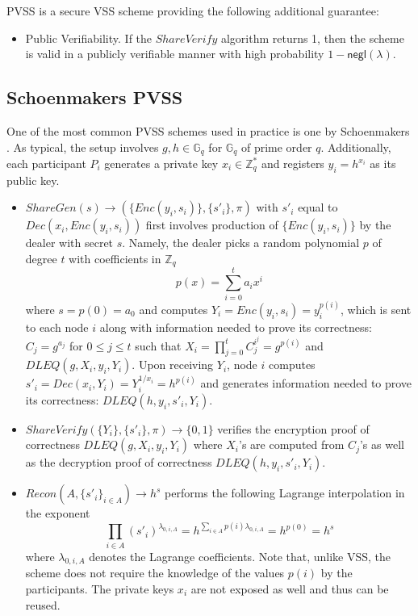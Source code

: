 \documentclass[letterpaper,twocolumn,10pt]{article}
\theoremstyle{definition}
\theoremstyle{remark}
\begin{document}
PVSS is a secure VSS scheme providing the following additional guarantee:
\begin{itemize}
    \item Public Verifiability. If the $ShareVerify$ algorithm returns 1, then the scheme is valid in a publicly verifiable manner with high probability $1 - \mathsf{negl}(\lambda)$.
\end{itemize}

\subsection{Schoenmakers PVSS}
\label{appendix:schoenmakersPVSS}
One of the most common PVSS schemes used in practice is one by Schoenmakers \cite{schoenmakers1999simple}. As typical, the setup involves $g, h \in \mathbb{G}_q$ for $\mathbb{G}_q$ of prime order $q$. Additionally, each participant $P_i$ generates a private key $x_i \in \mathbb{Z}^*_q$ and registers $y_i = h^{x_i}$ as its public key.

\begin{itemize}
\item $ShareGen(s) \rightarrow (\{Enc(y_i, s_i)\}, \{s'_i\}, \pi)$ with $s'_i$ equal to $Dec(x_i, Enc(y_i, s_i))$ first involves production of $\{Enc(y_i, s_i)\}$ by the dealer with secret $s$. Namely, the dealer picks a random polynomial $p$ of degree $t$ with coefficients in $\mathbb{Z}_q$
\[
p(x) = \sum_{i = 0}^{t} a_i x^i
\]
where $s = p(0) = a_0$ and computes $Y_i = Enc(y_i, s_i) = y_i^{p(i)}$, which is sent to each node $i$ along with information needed to prove its correctness: $C_j = g^{a_j}$ for $0 \leq j \leq t$ such that $X_i = \prod_{j = 0}^{t} C_j^{i^j} = g^{p(i)}$ and $DLEQ(g, X_i, y_i, Y_i)$. Upon receiving $Y_i$, node $i$ computes $s'_i = Dec(x_i, Y_i) = Y_i^{1 / x_i} = h^{p(i)}$ and generates information needed to prove its correctness: $DLEQ(h, y_i, s'_i, Y_i)$.
\item $ShareVerify(\{Y_i\}, \{s'_i\}, \pi) \rightarrow \{0, 1\}$ verifies the encryption proof of correctness $DLEQ(g, X_i, y_i, Y_i)$ where $X_i$'s are computed from $C_j$'s as well as the decryption proof of correctness $DLEQ(h, y_i, s'_i, Y_i)$.
\item $Recon(A, \{s'_i\}_{i \in A}) \rightarrow h^s$ performs the following Lagrange interpolation in the exponent
\[
\prod_{i \in A} (s'_i)^{\lambda_{0, i, A}} = h^{\sum_{i \in A} p(i) \lambda_{0, i, A}} = h^{p(0)} = h^s
\]
where $\lambda_{0, i, A}$ denotes the Lagrange coefficients. Note that, unlike VSS, the scheme does not require the knowledge of the values $p(i)$ by the participants. The private keys $x_i$ are not exposed as well and thus can be reused.
\end{itemize}
\end{document}
